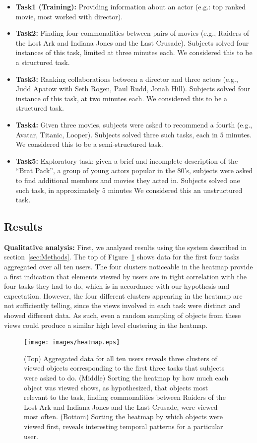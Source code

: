 \begin{itemize}
	\item \textbf{Task1 (Training):} Providing information about an actor (e.g.: top ranked movie, most worked with director).
	\item \textbf{Task2:} Finding four commonalities between pairs of movies (e.g., Raiders of the Lost Ark and Indiana Jones and the Last Crusade). Subjects solved four instances of this task, limited at three minutes each.  We considered this to be a structured task.
	\item \textbf{Task3:} Ranking collaborations between a director and three actors (e.g., Judd Apatow with Seth Rogen, Paul Rudd, Jonah Hill). Subjects solved four instance of this task, at two minutes each. We considered this to be a structured task.
	\item \textbf{Task4:} Given three movies, subjects were asked to recommend a fourth (e.g., Avatar, Titanic, Looper). Subjects solved three such tasks, each in $5$ minutes. We considered this to be a semi-structured task.
	\item \textbf{Task5:} Exploratory task: given a brief and incomplete description of the ``Brat Pack'', a group of young actors popular in the 80's, subjects were asked to find additional members and movies they acted in. Subjects solved one such task, in approximately $5$ minutes We considered this an unstructured task.
\end{itemize}


\subsection{Results}

\textbf{Qualitative analysis: } First, we analyzed results using the system described in section~\ref{sec:Methods}. The top of Figure~\ref{fig:heatmap} shows data for the first four tasks aggregated over all ten users. The four clusters noticeable in the heatmap provide a first indication that elements viewed by users are in tight correlation with the four tasks they had to do, which is in accordance with our hypothesis and expectation. However, the four different clusters appearing in the heatmap are not sufficiently telling, since the views involved in each task were distinct and showed different data. As such, even a random sampling of objects from these views could produce a similar high level clustering in the heatmap. 

\begin{figure}[htb]
  \centering
  \texttt{[image: images/heatmap.eps]}
  \caption{(Top) Aggregated data for all ten users reveals three clusters of viewed objects corresponding to the first three tasks that subjects were asked to do. (Middle) Sorting the heatmap by how much each object was viewed shows, as hypothesized, that objects most relevant to the task, finding commonalities between Raiders of the Lost Ark and Indiana Jones and the Last Crusade, were viewed most often. (Bottom) Sorting the heatmap by which objects were viewed first, reveals interesting temporal patterns for a particular user. }
	\label{fig:heatmap}
\end{figure}

